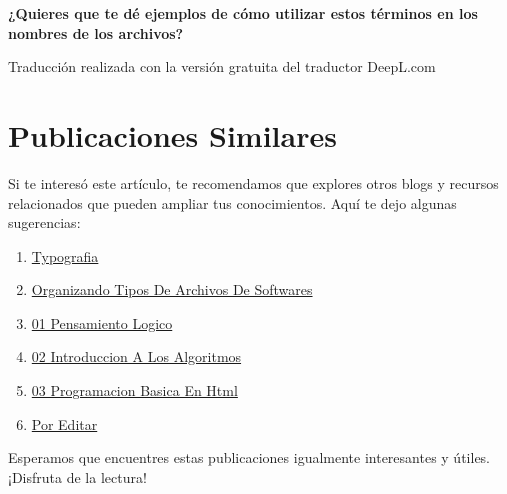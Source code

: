 \documentclass[
  jou,
  floatsintext,
  longtable,
  a4paper,
  nolmodern,
  notxfonts,
  notimes,
  colorlinks=true,linkcolor=blue,citecolor=blue,urlcolor=blue]{apa7}
\providecommand{\tightlist}{%
  \setlength{\itemsep}{0pt}\setlength{\parskip}{0pt}}
\begin{document}
\textbf{¿Quieres que te dé ejemplos de cómo utilizar estos términos en
los nombres de los archivos?}

Traducción realizada con la versión gratuita del traductor DeepL.com

\section{Publicaciones Similares}\label{publicaciones-similares}

Si te interesó este artículo, te recomendamos que explores otros blogs y
recursos relacionados que pueden ampliar tus conocimientos. Aquí te dejo
algunas sugerencias:

\begin{enumerate}
\def\labelenumi{\arabic{enumi}.}
\tightlist
\item
  \href{https://achalmaedison.netlify.app/programacion-software/fundamentos-programacion/2018-06-09-typografia/index.pdf}{}
  \href{https://achalmaedison.netlify.app/programacion-software/fundamentos-programacion/2018-06-09-typografia}{Typografia}
\item
  \href{https://achalmaedison.netlify.app/programacion-software/fundamentos-programacion/2019-08-13-organizando-tipos-de-archivos-de-softwares/index.pdf}{}
  \href{https://achalmaedison.netlify.app/programacion-software/fundamentos-programacion/2019-08-13-organizando-tipos-de-archivos-de-softwares}{Organizando
  Tipos De Archivos De Softwares}
\item
  \href{https://achalmaedison.netlify.app/programacion-software/fundamentos-programacion/2021-01-04-01-pensamiento-logico/index.pdf}{}
  \href{https://achalmaedison.netlify.app/programacion-software/fundamentos-programacion/2021-01-04-01-pensamiento-logico}{01
  Pensamiento Logico}
\item
  \href{https://achalmaedison.netlify.app/programacion-software/fundamentos-programacion/2021-01-11-02-introduccion-a-los-algoritmos/index.pdf}{}
  \href{https://achalmaedison.netlify.app/programacion-software/fundamentos-programacion/2021-01-11-02-introduccion-a-los-algoritmos}{02
  Introduccion A Los Algoritmos}
\item
  \href{https://achalmaedison.netlify.app/programacion-software/fundamentos-programacion/2021-01-18-03-programacion-basica-en-html/index.pdf}{}
  \href{https://achalmaedison.netlify.app/programacion-software/fundamentos-programacion/2021-01-18-03-programacion-basica-en-html}{03
  Programacion Basica En Html}
\item
  \href{https://achalmaedison.netlify.app/programacion-software/fundamentos-programacion/2024-03-31-por-editar/index.pdf}{}
  \href{https://achalmaedison.netlify.app/programacion-software/fundamentos-programacion/2024-03-31-por-editar}{Por
  Editar}
\end{enumerate}

Esperamos que encuentres estas publicaciones igualmente interesantes y
útiles. ¡Disfruta de la lectura!
\end{document}
